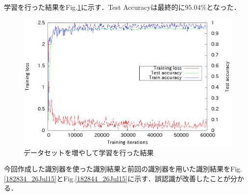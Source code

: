 \documentclass[a4paper,10pt]{jsarticle}
\begin{document}
学習を行った結果をFig.\ref{181752_26Jul15}に示す．Test Accuracyは最終的に$95.04\%$となった．
\begin{figure}[tb]
  \begin{center}
    \includegraphics[clip,width=12cm]{./fig/eps/result_train_test_lovelive_full.eps}
  \end{center}
  \caption{データセットを増やして学習を行った結果}
  \label{181752_26Jul15}
\end{figure}



今回作成した識別器を使った識別結果と前回の識別器を用いた識別結果をFig.\ref{182834_26Jul15}とFig.\ref{182844_26Jul15}に示す．誤認識が改善したことが分かる．
\end{document}
